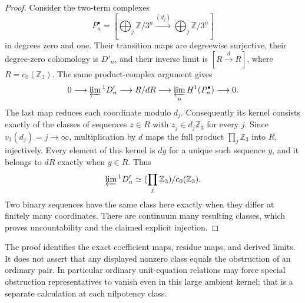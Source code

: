 \begin{proof}
Consider the two-term complexes
\[
 P_n^\bullet=\left[
 \bigoplus_j\mathbb Z/3^n\xrightarrow{(d_j)}
 \bigoplus_j\mathbb Z/3^n\right]
\]
in degrees zero and one. Their transition maps are
degreewise surjective, their degree-zero cohomology is
\(D'_n\), and their inverse limit is
\([R\xrightarrow{d}R]\), where \(R=c_0(\mathbb Z_3)\).
The same product-complex argument gives
\[
 0\longrightarrow\varprojlim{}^1D'_n
 \longrightarrow R/dR
 \longrightarrow\varprojlim_n H^1(P_n^\bullet)
 \longrightarrow0.
\]
The last map reduces each coordinate modulo \(d_j\).
Consequently its kernel consists exactly of the classes
of sequences \(z\in R\) with \(z_j\in d_j\mathbb Z_3\)
for every \(j\). Since \(v_3(d_j)=j\to\infty\),
multiplication by \(d\) maps the full product
\(\prod_j\mathbb Z_3\) into \(R\), injectively. Every
element of this kernel is \(dy\) for a unique such
sequence \(y\), and it belongs to \(dR\) exactly when
\(y\in R\). Thus
\[
 \varprojlim{}^1D'_n\simeq
       (\prod_j\mathbb Z_3)/c_0(\mathbb Z_3).
\]
Two binary sequences have the same class here exactly
when they differ at finitely many coordinates. There are
continuum many resulting classes, which proves
uncountability and the claimed explicit injection.
\end{proof}

The proof identifies the exact coefficient maps, residue
maps, and derived limits. It does not assert that any
displayed nonzero class equals the obstruction of an
ordinary pair. In particular ordinary unit-equation
relations may force special obstruction representatives
to vanish even in this large ambient kernel; that is a
separate calculation at each nilpotency class.
